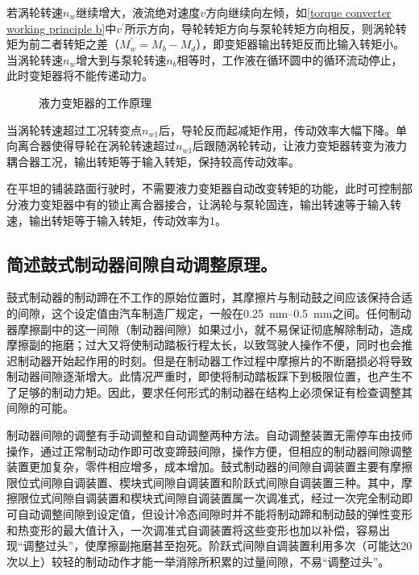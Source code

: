 \documentclass[UTF8]{ctexart}
\numberwithin{figure}{section}
\numberwithin{table}{section}
\begin{document}
若涡轮转速$n_w$继续增大，液流绝对速度$v$方向继续向左倾，如\cref{torque converter working principle b}中$v^{\prime}$所示方向，导轮转矩方向与泵轮转矩方向相反，则涡轮转矩为前二者转矩之差（$M_w^{\prime} = M_b-M_d$），即变矩器输出转矩反而比输入转矩小。当涡轮转速$n_w$增大到与泵轮转速$n_b$相等时，工作液在循环圆中的循环流动停止，此时变矩器将不能传递动力。

\begin{figure}[htbp]
	\centering
	\begin{minipage}[b]{0.8\textwidth}
		\centering
		\caption{液力变矩器的工作原理}
		\label{torque converter working principle}
	\end{minipage}
\end{figure}

当涡轮转速超过工况转变点$n_{w1}$后，导轮反而起减矩作用，传动效率大幅下降。单向离合器使得导轮在涡轮转速超过$n_{w1}$后跟随涡轮转动，让液力变矩器转变为液力耦合器工况，输出转矩等于输入转矩，保持较高传动效率。

在平坦的铺装路面行驶时，不需要液力变矩器自动改变转矩的功能，此时可控制部分液力变矩器中有的锁止离合器接合，让涡轮与泵轮固连，输出转速等于输入转速，输出转矩等于输入转矩，传动效率为1。

\subsection{简述鼓式制动器间隙自动调整原理。}

鼓式制动器的制动蹄在不工作的原始位置时，其摩擦片与制动鼓之间应该保持合适的间隙，这个设定值由汽车制造厂规定，一般在\qtyrange[range-phrase = $\,\sim\,$, range-units = single]{0.25}{0.5}{\mm}之间。任何制动器摩擦副中的这一间隙（制动器间隙）如果过小，就不易保证彻底解除制动，造成摩擦副的拖磨；过大又将使制动踏板行程太长，以致驾驶人操作不便，同时也会推迟制动器开始起作用的时刻。但是在制动器工作过程中摩擦片的不断磨损必将导致制动器间隙逐渐增大。此情况严重时，即使将制动踏板踩下到极限位置，也产生不了足够的制动力矩。因此，要求任何形式的制动器在结构上必须保证有检查调整其间隙的可能。

制动器间隙的调整有手动调整和自动调整两种方法。自动调整装置无需停车由技师操作，通过正常制动动作即可改变蹄鼓间隙，操作方便，但相应的制动器间隙调整装置更加复杂，零件相应增多，成本增加。鼓式制动器的间隙自调装置主要有摩擦限位式间隙自调装置、楔块式间隙自调装置和阶跃式间隙自调装置三种。其中，摩擦限位式间隙自调装置和楔块式间隙自调装置属一次调准式，经过一次完全制动即可自动调整间隙到设定值，但设计冷态间隙时并不能将制动蹄和制动鼓的弹性变形和热变形的最大值计入，一次调准式自调装置将这些变形也加以补偿，容易出现“调整过头”，使摩擦副拖磨甚至抱死。阶跃式间隙自调装置利用多次（可能达20次以上）较轻的制动动作才能一举消除所积累的过量间隙，不易“调整过头”。
\end{document}
